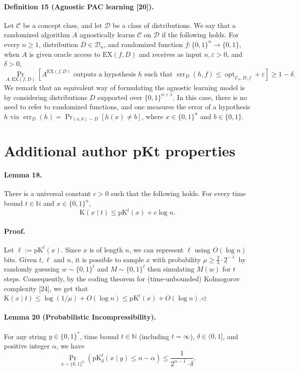 \paragraph{Definition 15 (Agnostic PAC learning [20]).} Let $\mathcal C$ be a concept class, and let $\mathcal D$ be a class of distributions. We say that a randomized algorithm $A$ agnostically learns $\mathcal C$ on $\mathcal D$ if the following holds. For every $n\geq1$, distribution $D\in\mathcal D_n$, and randomized function $f:\{0,1\}^n\to\{0,1\}$, when $A$ is given oracle access to $\mathrm{EX}(f,D)$ and receives as input $n,\varepsilon>0$, and $\delta>0$,
\[\Pr_{A,\mathrm{EX}(f,D)}[A^{\mathrm{EX}(f,D)}\text{ outputs a hypothesis }h\text{ such that }\operatorname{err}_D(h,f)\leq\operatorname{opt}_{\mathcal C_n,D,f}+\varepsilon]\geq1-\delta.\]
We remark that an equivalent way of formulating the agnostic learning model is by considering distributions $D$ supported over $\{0,1\}^{n+1}$. In this case, there is no need to refer to randomized functions, and one measures the error of a hypothesis $h$ via $\operatorname{err}_D(h)=\Pr_{(x,b)\sim D}[h(x)\neq b]$, where $x\in\{0,1\}^n$ and $b\in\{0,1\}$.
\section*{Additional author pKt properties}
\paragraph{Lemma 18.} There is a universal constant $c>0$ such that the following holds. For every time bound $t\in\mathbb N$ and $x\in\{0,1\}^n$,
\[\mathrm K(x\mid t)\leq\mathrm{pK}^t(x)+c\log n.\]
\paragraph{Proof.} Let $\ell:=\mathrm{pK}^t(x)$. Since $x$ is of length $n$, we can represent $\ell$ using $O(\log n)$ bits. Given $t,\ell$ and $n$, it is possible to sample $x$ with probability $\mu\geq\frac23\cdot2^{-\ell}$ by randomly guessing $w\sim\{0,1\}^t$ and $M\sim\{0,1\}^\ell$ then simulating $M(w)$ for $t$ steps. Consequently, by the coding theorem for (time-unbounded) Kolmogorov complexity [24], we get that $\mathrm K(x\mid t)\leq\log(1/\mu)+O(\log n)\leq\mathrm{pK}^t(x)+O(\log n)$.\hfill$\triangleleft$
\paragraph{Lemma 20 (Probabilistic Incompressibility).} For any string $y\in\{0,1\}^*$, time bound $t\in\mathbb N$ (including $t=\infty$), $\delta\in(0,1]$, and positive integer $\alpha$, we have
\[\Pr_{x\sim\{0,1\}^n}(\mathrm{pK}_\delta^t(x\mid y)\leq n-\alpha)\leq\frac1{2^{\alpha-1}\cdot\delta}.\]
